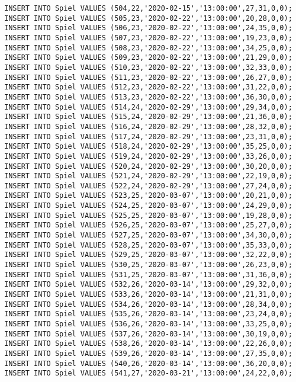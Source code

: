 \documentclass{lehramt-informatik-aufgabe}
\begin{document}
\begin{verbatim}
INSERT INTO Spiel VALUES (504,22,'2020-02-15','13:00:00',27,31,0,0);
INSERT INTO Spiel VALUES (505,23,'2020-02-22','13:00:00',20,28,0,0);
INSERT INTO Spiel VALUES (506,23,'2020-02-22','13:00:00',24,35,0,0);
INSERT INTO Spiel VALUES (507,23,'2020-02-22','13:00:00',19,23,0,0);
INSERT INTO Spiel VALUES (508,23,'2020-02-22','13:00:00',34,25,0,0);
INSERT INTO Spiel VALUES (509,23,'2020-02-22','13:00:00',21,29,0,0);
INSERT INTO Spiel VALUES (510,23,'2020-02-22','13:00:00',32,33,0,0);
INSERT INTO Spiel VALUES (511,23,'2020-02-22','13:00:00',26,27,0,0);
INSERT INTO Spiel VALUES (512,23,'2020-02-22','13:00:00',31,22,0,0);
INSERT INTO Spiel VALUES (513,23,'2020-02-22','13:00:00',36,30,0,0);
INSERT INTO Spiel VALUES (514,24,'2020-02-29','13:00:00',29,34,0,0);
INSERT INTO Spiel VALUES (515,24,'2020-02-29','13:00:00',21,36,0,0);
INSERT INTO Spiel VALUES (516,24,'2020-02-29','13:00:00',28,32,0,0);
INSERT INTO Spiel VALUES (517,24,'2020-02-29','13:00:00',23,31,0,0);
INSERT INTO Spiel VALUES (518,24,'2020-02-29','13:00:00',35,25,0,0);
INSERT INTO Spiel VALUES (519,24,'2020-02-29','13:00:00',33,26,0,0);
INSERT INTO Spiel VALUES (520,24,'2020-02-29','13:00:00',30,20,0,0);
INSERT INTO Spiel VALUES (521,24,'2020-02-29','13:00:00',22,19,0,0);
INSERT INTO Spiel VALUES (522,24,'2020-02-29','13:00:00',27,24,0,0);
INSERT INTO Spiel VALUES (523,25,'2020-03-07','13:00:00',20,21,0,0);
INSERT INTO Spiel VALUES (524,25,'2020-03-07','13:00:00',24,29,0,0);
INSERT INTO Spiel VALUES (525,25,'2020-03-07','13:00:00',19,28,0,0);
INSERT INTO Spiel VALUES (526,25,'2020-03-07','13:00:00',25,27,0,0);
INSERT INTO Spiel VALUES (527,25,'2020-03-07','13:00:00',34,30,0,0);
INSERT INTO Spiel VALUES (528,25,'2020-03-07','13:00:00',35,33,0,0);
INSERT INTO Spiel VALUES (529,25,'2020-03-07','13:00:00',32,22,0,0);
INSERT INTO Spiel VALUES (530,25,'2020-03-07','13:00:00',26,23,0,0);
INSERT INTO Spiel VALUES (531,25,'2020-03-07','13:00:00',31,36,0,0);
INSERT INTO Spiel VALUES (532,26,'2020-03-14','13:00:00',29,32,0,0);
INSERT INTO Spiel VALUES (533,26,'2020-03-14','13:00:00',21,31,0,0);
INSERT INTO Spiel VALUES (534,26,'2020-03-14','13:00:00',28,34,0,0);
INSERT INTO Spiel VALUES (535,26,'2020-03-14','13:00:00',23,24,0,0);
INSERT INTO Spiel VALUES (536,26,'2020-03-14','13:00:00',33,25,0,0);
INSERT INTO Spiel VALUES (537,26,'2020-03-14','13:00:00',30,19,0,0);
INSERT INTO Spiel VALUES (538,26,'2020-03-14','13:00:00',22,26,0,0);
INSERT INTO Spiel VALUES (539,26,'2020-03-14','13:00:00',27,35,0,0);
INSERT INTO Spiel VALUES (540,26,'2020-03-14','13:00:00',36,20,0,0);
INSERT INTO Spiel VALUES (541,27,'2020-03-21','13:00:00',24,22,0,0);

\end{verbatim}
\end{document}
